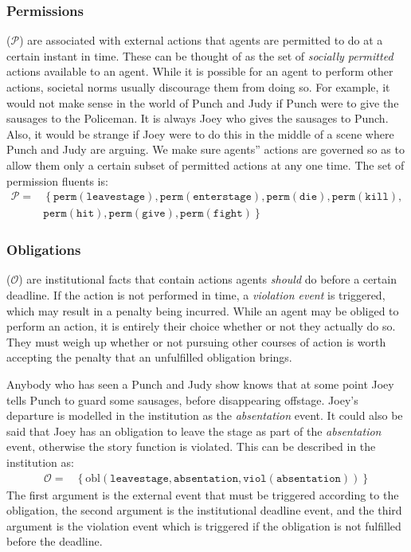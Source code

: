 \documentclass[11pt]{report}
\begin{document}
\subsubsection{Permissions} ($\mathcal{P}$) are associated with external actions that agents are permitted to do at a certain instant in time. These can be thought of as the set of \emph{socially permitted\/} actions available to an agent. While it is possible for an agent to perform other actions, societal norms usually discourage them from doing so.
For example, it would not make sense in the world of Punch and Judy if Punch were to give the sausages to the Policeman. It is always Joey who gives the sausages to Punch. Also, it would be strange if Joey were to do this in the middle of a scene where Punch and Judy are arguing. We make sure agents'' actions are governed so as to allow them only a certain subset of permitted actions at any one time. The set of permission fluents is:
\begin{align*}
\mathcal{P} =& \left\{\mathtt{perm(leavestage), perm(enterstage), perm(die), perm(kill),}\right.\nonumber\\
             &\left. {} \mathtt{perm(hit), perm(give), perm(fight)}\right\} %
\end{align*}

\subsubsection{Obligations} ($\mathcal{O}$) are institutional facts that contain actions agents \emph{should} do before a certain deadline. If the action is not performed in time, a \emph{violation event} is triggered, which may result in a penalty being incurred. While an agent may be obliged to perform an action, it is entirely their choice whether or not they actually do so. They must weigh up whether or not pursuing other courses of action is worth accepting the penalty that an unfulfilled obligation brings.

Anybody who has seen a Punch and Judy show knows that at some point Joey tells Punch to guard some sausages, before disappearing offstage. Joey's departure is modelled in the institution as the \emph{absentation\/} event. It could also be said that Joey has an obligation to leave the stage as part of the \emph{absentation} event, otherwise the story function is violated. This can be described in the institution as:
\begin{align*}
  \mathcal{O} =& \left\{\text{obl}(\mathtt{leavestage, absentation, viol(absentation)})\right\}%
\end{align*}
The first argument is the external event that must be triggered according to the obligation, the second argument is the institutional deadline event, and the third argument is the violation event which is triggered if the obligation is not fulfilled before the deadline. 
\end{document}

